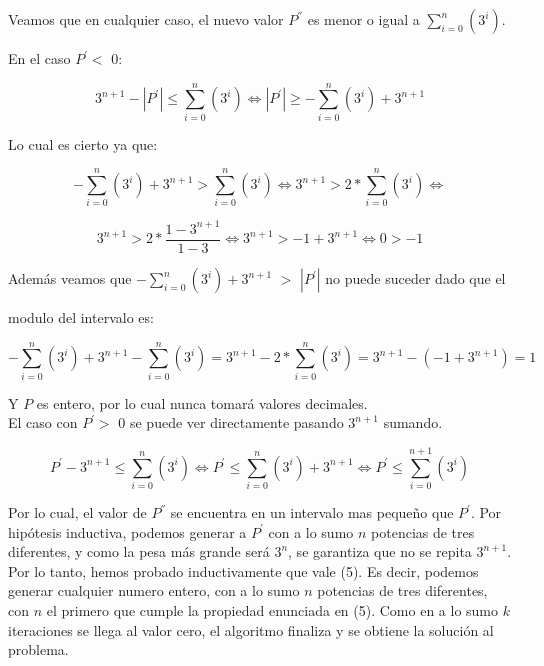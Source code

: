 Veamos que en cualquier caso, el nuevo valor $P^{''}$ es menor o igual a $\sum_{i=0}^{n}(3^i)$.

En el caso $P^{'} <$ 0:

\begin{equation}
3^{n+1} - |P^{'}| \leq \sum_{i=0}^{n}(3^i) \iff
|P^{'}| \geq - \sum_{i=0}^{n}(3^i) + 3^{n+1}
\end{equation}

Lo cual es cierto ya que:

\begin{equation}
- \sum_{i=0}^{n}(3^i) + 3^{n+1} >  \sum_{i=0}^{n}(3^i) \iff
3^{n+1} > 2 \ast \sum_{i=0}^{n}(3^i) \iff
\end{equation}

\begin{equation}
3^{n+1} > 2 \ast \frac{1-3^{n+1}}{1-3} \iff
3^{n+1} > -1+3^{n+1} \iff
0 > -1
\end{equation}

Además veamos que $- \sum_{i=0}^{n}(3^i) + 3^{n+1}$ $>$ $|P^{'}|$ no puede suceder dado que el 

modulo del intervalo es:

 \begin{equation}
- \sum_{i=0}^{n}(3^i) + 3^{n+1} - \sum_{i=0}^{n}(3^i) = 
 3^{n+1} - 2 \ast \sum_{i=0}^{n}(3^i) =
 3^{n+1} - (-1 + 3^{n+1}) = 
1 
\end{equation}

Y $P$ es entero, por lo cual nunca tomará valores decimales.\\


El caso con $P^{'} >$ 0 se puede ver directamente pasando $3^{n+1}$ sumando.

\begin{equation}
P^{'} - 3^{n+1} \leq \sum_{i=0}^{n}(3^i) \iff
P^{'} \leq \sum_{i=0}^{n}(3^i) + 3^{n+1} \iff
P^{'} \leq \sum_{i=0}^{n+1}(3^i)
\end{equation}

Por lo cual, el valor de $P^{''}$ se encuentra en un intervalo mas pequeño que $P^{'}$. Por hipótesis inductiva, podemos generar a $P^{'}$ con a lo sumo $n$ potencias de tres diferentes, y como la pesa más grande será $3^{n}$, se garantiza que no se repita $3^{n+1}$.
Por lo tanto, hemos probado inductivamente que vale (5). Es decir, podemos generar cualquier numero entero, con a lo sumo $n$ potencias de tres diferentes, con $n$ el primero que cumple la propiedad enunciada en (5).
Como en a lo sumo $k$ iteraciones se llega al valor cero, el algoritmo finaliza y se obtiene la solución al problema.
